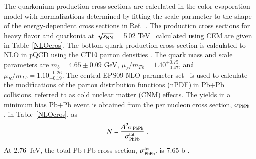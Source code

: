 The quarkonium production cross sections are calculated in the
color evaporation model with normalizations determined by fitting the
scale parameter to the shape of the energy-dependent cross sections in Ref.~\cite{Nelson:2012bc}.
The production cross sections for heavy flavor and quarkonia at $\sqrt{s_{\rm NN}}$ = 5.02 
TeV~\cite{Kumar:2012qx} calculated using CEM are given in Table~\ref{NLOcros}.
The bottom quark production cross section is calculated to NLO in pQCD  
using the CT10 parton densities \cite{Lai:2010vv}.
The quark mass and scale parameters are $m_b = 4.65 \pm 0.09$ GeV,
$\mu_F/m_{T\, b} = 1.40^{+0.75}_{-0.47}$, and $\mu_R/m_{T\, b} = 1.10^{+0.26}_{-0.19}$.
The central EPS09 NLO parameter set~\cite{Eskola:2009uj} is used to 
calculate the modifications of the parton distribution functions (nPDF) in 
Pb+Pb collisions, referred to as cold nuclear matter (CNM) effects.
The yields in a minimum bias 
Pb+Pb event is obtained from the per nucleon cross
section, $\sigma_{\rm PbPb}$, in Table~\ref{NLOcros}, as
\begin{eqnarray}
N = {A^2 \sigma_{\rm PbPb} \over  
\sigma_{\rm PbPb}^{\rm tot}} \, \, .
\end{eqnarray}
 At 2.76 TeV, the total Pb+Pb cross section, $\sigma_{\rm PbPb}^{\rm tot}$, 
is 7.65 b \cite{Chatrchyan:2011sx}.


%
%




